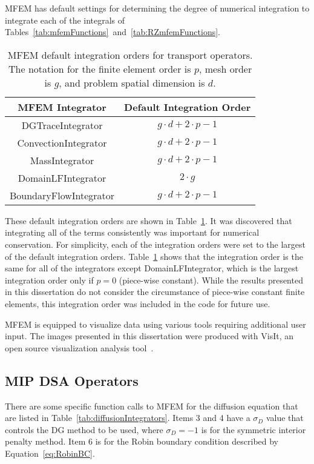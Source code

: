 \documentclass{article}
\begin{document}
MFEM has default settings for determining the degree of numerical integration to integrate each of the integrals of Tables~\ref{tab:mfemFunctions}~and~\ref{tab:RZmfemFunctions}.
%
\begin{table}[tb]
\centering
{\renewcommand{\arraystretch}{2}
\begin{tabular}{|c|c|}
\hline
\multicolumn{1}{|c}{\textbf{MFEM Integrator}} & \multicolumn{1}{|c|}{\textbf{Default Integration Order}} \\
\hline \hline
DGTraceIntegrator & $g \cdot d + 2 \cdot p - 1$ \\
\hline
ConvectionIntegrator & $g \cdot d + 2 \cdot p - 1$ \\
\hline
MassIntegrator & $g \cdot d + 2 \cdot p - 1$ \\
\hline
DomainLFIntegrator & $2 \cdot g$ \\
\hline
BoundaryFlowIntegrator & $g \cdot d + 2 \cdot p - 1$ \\
\hline
\end{tabular}}
\caption{MFEM default integration orders for transport operators. The notation for the finite element order is $p$, mesh order is $g$, and problem spatial dimension is $d$.}
\label{tab:integrationOrders}
\end{table}
%
These default integration orders are shown in Table~\ref{tab:integrationOrders}. It was discovered that integrating all of the terms consistently was important for numerical conservation. For simplicity, each of the integration orders were set to the largest of the default integration orders. Table~\ref{tab:integrationOrders} shows that the integration order is the same for all of the integrators except DomainLFIntegrator, which is the largest integration order only if $p = 0$ (piece-wise constant). While the results presented in this dissertation do not consider the circumstance of piece-wise constant finite elements, this integration order was included in the code for future use.

MFEM is equipped to visualize data using various tools requiring additional user input. The images presented in this dissertation were produced with VisIt, an open source visualization analysis tool~\cite{VisIt_Web}.

\subsection{MIP DSA Operators}
\label{sub:MIPDSAOperators}
There are some specific function calls to MFEM for the diffusion equation that are listed in Table~\ref{tab:diffusionIntegrators}. Items 3 and 4 have a $\sigma_D$ value that controls the DG method to be used, where $\sigma_D = -1$ is for the symmetric interior penalty method. Item 6 is for the Robin boundary condition described by Equation~\ref{eq:RobinBC}.
\end{document}

